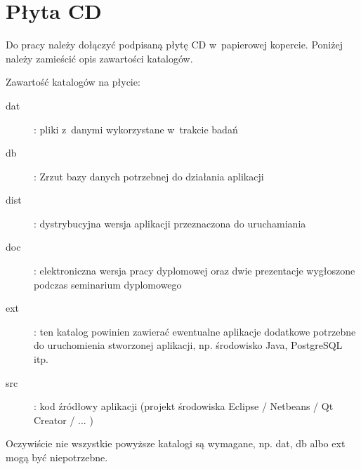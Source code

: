 \chapter{Płyta CD}\label{app:plyta}

\begin{figure}[htb]
\makebox[\textwidth]{\framebox[12.8cm]{\rule{0pt}{12.8cm}}}
\end{figure}
\pagebreak
{\color{red} Do pracy należy dołączyć podpisaną płytę CD w~papierowej
  kopercie.  Poniżej należy zamieścić opis zawartości katalogów.}

Zawartość katalogów na płycie:
\begin{description}
\item[dat] : {\color{red} pliki z~danymi wykorzystane w~trakcie badań}
\item[db] : {\color{red} Zrzut bazy danych potrzebnej do działania aplikacji}
\item[dist] : dystrybucyjna wersja aplikacji przeznaczona do uruchamiania
\item[doc] : elektroniczna wersja pracy dyplomowej oraz dwie prezentacje
  wygłoszone podczas seminarium dyplomowego
\item[ext] : {\color{red} ten katalog powinien zawierać ewentualne aplikacje
  dodatkowe potrzebne do uruchomienia stworzonej aplikacji, np. środowisko Java,
  PostgreSQL itp.}
\item[src] : kod źródłowy aplikacji {\color{red}(projekt środowiska Eclipse /
  Netbeans / Qt Creator / ... })
\end{description}

{\color{red} Oczywiście nie wszystkie powyższe katalogi są wymagane, np. dat, db
  albo ext mogą być niepotrzebne.}
